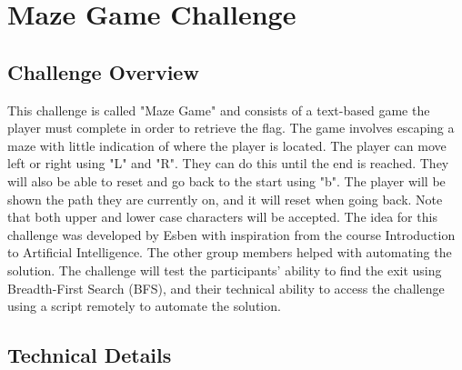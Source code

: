 \section{Maze Game Challenge}\label{sec:maze-challenge}

\subsection{Challenge Overview}



This challenge is called "Maze Game" and consists of a text-based game the player must complete in order to retrieve the flag. The game involves escaping a maze with little indication of where the player is located. The player can move left or right using "L" and "R". They can do this until the end is reached. They will also be able to reset and go back to the start using "b". The player will be shown the path they are currently on, and it will reset when going back. Note that both upper and lower case characters will be accepted. The idea for this challenge was developed by Esben with inspiration from the course Introduction to Artificial Intelligence\cite{sdu_dm577}. The other group members helped with automating the solution. The challenge will test the participants' ability to find the exit using Breadth-First Search (BFS), and their technical ability to access the challenge using a script remotely to automate the solution. 

\subsection{Technical Details}
